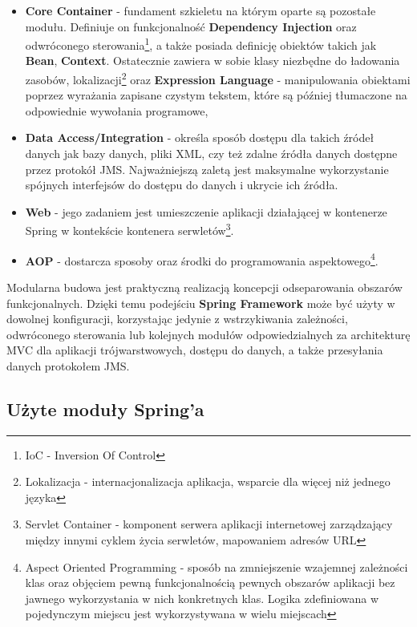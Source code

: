 	 \begin{itemize}
	 	\item \textbf{Core Container} - fundament szkieletu na którym oparte są pozostałe modułu. Definiuje on funkcjonalność \textbf{Dependency Injection} oraz odwróconego sterowania\footnote{IoC - Inversion Of Control}, a także posiada definicję obiektów takich jak \textbf{Bean}, \textbf{Context}. Ostatecznie zawiera w sobie klasy niezbędne do ładowania zasobów, lokalizacji\footnote{Lokalizacja - internacjonalizacja aplikacja, wsparcie dla więcej niż jednego języka} oraz \textbf{Expression Language} - manipulowania obiektami poprzez wyrażania zapisane czystym tekstem, które są później tłumaczone na odpowiednie wywołania programowe,
	 	\item \textbf{Data Access/Integration} - określa sposób dostępu dla takich źródeł danych jak bazy danych, pliki XML, czy też zdalne źródła danych dostępne przez protokół JMS. Najważniejszą zaletą jest maksymalne wykorzystanie spójnych interfejsów do dostępu do danych i ukrycie ich źródła.  
	 	\item \textbf{Web} - jego zadaniem jest umieszczenie aplikacji działającej w kontenerze Spring w kontekście kontenera serwletów\footnote{Servlet Container - komponent serwera aplikacji internetowej zarządzający między innymi cyklem życia serwletów, mapowaniem adresów URL}. 
	 	\item \textbf{AOP} - dostarcza sposoby oraz środki do programowania aspektowego\footnote{Aspect Oriented Programming - sposób na zmniejszenie wzajemnej zależności klas oraz objęciem pewną funkcjonalnością pewnych obszarów aplikacji bez jawnego wykorzystania w nich konkretnych klas. Logika zdefiniowana w pojedynczym miejscu jest wykorzystywana w wielu miejscach}.
	 \end{itemize}
	 Modularna budowa jest praktyczną realizacją koncepcji odseparowania obszarów funkcjonalnych. Dzięki temu podejściu \textbf{Spring Framework} może być użyty w dowolnej konfiguracji, korzystając jedynie z wstrzykiwania zależności, odwróconego sterowania lub kolejnych modułów odpowiedzialnych za architekturę MVC dla aplikacji trójwarstwowych, dostępu do danych, a także przesyłania danych protokołem JMS.
		
	\subsection{Użyte moduły Spring'a}
	
